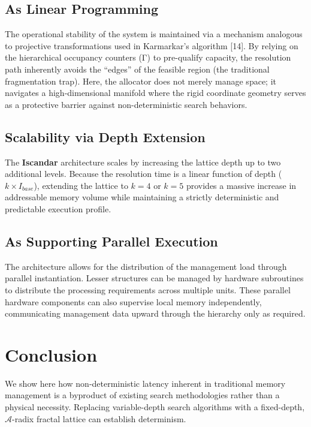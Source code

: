\documentclass[11pt]{article}
\begin{document}
\subsection{As Linear Programming}

The operational stability of the system is maintained via a mechanism analogous to projective transformations used in Karmarkar’s algorithm [14]. By relying on the hierarchical occupancy counters (Γ) to pre-qualify capacity, the resolution path inherently avoids the “edges” of the feasible region (the traditional fragmentation trap). Here, the allocator does not merely manage space; it navigates a high-dimensional manifold where the rigid coordinate geometry serves as a protective barrier against non-deterministic search behaviors.

\subsection{Scalability via Depth Extension}
The \textbf{Iscandar} architecture scales by increasing the lattice depth up to two additional levels. Because the resolution time is a linear function of depth ($k \times I_{base}$), extending the lattice to $k = 4$ or $k = 5$ provides a massive increase in addressable memory volume while maintaining a strictly deterministic and predictable execution profile.

\subsection{As Supporting Parallel Execution}

The architecture allows for the distribution of the management load through parallel instantiation. Lesser structures can be managed by hardware subroutines to distribute the processing requirements across multiple units. These parallel hardware components can also supervise local memory independently, communicating management data upward through the hierarchy only as required.

\section{Conclusion}
We show here how non-deterministic latency inherent in traditional memory management is a byproduct of existing search methodologies rather than a physical necessity. Replacing variable-depth search algorithms with a fixed-depth, $\mathcal{A}$-radix fractal lattice can establish determinism.\\
\end{document}

